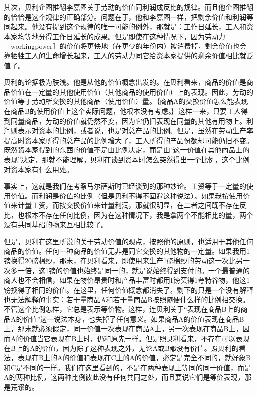 其次，贝利企图推翻李嘉图关于劳动的价值同利润成反比的规律。而且他企图推翻的恰恰是这个规律的正确部分。问题在于，他和李嘉图一样，把剩余价值和利润等同起来。他没有提到这个规律的唯一可能的例外，那就是：工作日延长，工人和资本家均等地分得工作日延长的成果。但是即使在这种情况下，因为劳动力［workingpower］的价值将更快地（在更少的年份内）被消费掉，剩余价值也会靠牺牲工人的生命增长起来，工人的劳动力同它给资本家提供的剩余价值相比就贬值了。

贝利的论据极为肤浅。他是从他的价值概念出发的。在贝利看来，商品的价值是商品价值在一定量的其他使用价值（其他商品的使用价值）上的表现。因此，劳动的价值等于劳动所交换的其他商品（使用价值）量。｛商品A的交换价值怎么能表现在商品B的使用价值上这个实际问题，他根本没有考虑。｝这样一来，只要工人得到同量商品，劳动的价值就仍然不变，因为它仍旧表现在同量的其他有用物上。利润则表示对资本的比例，或者说，也是对总产品的比例。但是，虽然在劳动生产率提高时资本家所得的总产品的比例增大了，工人所得的产品份额却可能仍旧不变。既然资本家得到的东西的价值不是由比例决定，而是由“这一价值在其他商品上的表现”决定，那就不能理解，贝利在谈到资本时怎么突然得出一个比例，这个比例对资本家有什么用处。

事实上，这就是我们在考察马尔萨斯时已经谈到的那种妙论。工资等于一定量的使用价值。而利润是价值的比例（但是贝利不得不回避这种说法）。如果我按使用价值来计量工资，而按交换价值来计量利润，那就很明显，在二者之间既不存在反比，也根本不存在任何比例，因为在这种情况下，我是拿两个不能相比的量，两个没有共同基础的物来互相比较了。

但是，贝利在这里所说的关于劳动价值的观点，按照他的原则，也适用于其他任何商品的价值。任何一种商品的价值无非是同它交换的其他物的一定量。如果我用1镑换得20磅棉纱，那末，在贝利看来，即使用来生产1磅棉纱的劳动这一次比另一次多一倍，这1镑的价值也始终是同一的，就是说始终得到支付的。一个最普通的商人也不会相信，如果在物价昂贵时和产品丰富时都用1镑买得1夸特谷物，他这1镑换得了相同的价值。在这里，任何价值概念都消失了。剩下的只是一个没有解释也无法解释的事实：若干量商品A和若干量商品B按照随便什么样的比例相交换。不管这个比例怎样，它总是表示等价物。这样，连贝利关于“表现在商品B上的商品A的价值”这一说法本身，也失掉了任何意义。如果商品A的价值表现在商品B上，那末就必须假定，同一价值一次表现在商品A上，另一次表现在商品B上，因而A的价值当它表现在B上时，仍和原先一样。但是照贝利看来，不存在可以表现在B上的A的价值，因为除了这种表现之外，无论A或B都没有价值。照贝利的看法，表现在B上的A的价值和表现在C上的A的价值，必定是完全不同的，就好象B和C是不同的一样。我们在这里看到的，不是在两种表现上等同的同一价值，而是A的两种比例，这两种比例彼此没有任何共同之处，而且要说它们是等价表现，那是荒谬的。

